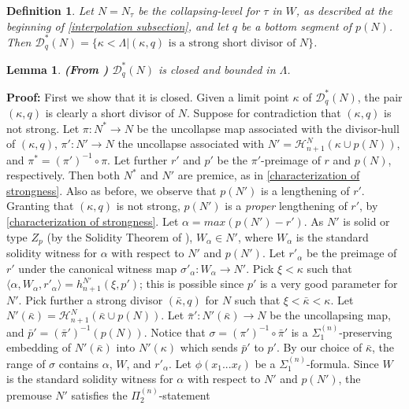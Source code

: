 \documentclass[12pt]{article}
\newtheorem{lem}[thm]{Lemma}
\newtheorem{defn}[thm]{Definition}
\begin{document}
\begin{defn} \label{set of strong divisors}
Let $N = N_\tau$ be the collapsing-level for $\tau$ in $W$, as described at the beginning of \ref{interpolation subsection}, and let $q$ be a bottom segment of $p(N)$.  Then $\mathcal{D}^*_q (N) = \{ \kappa < \Lambda | (\kappa , q) \text{ is a strong short divisor of } N \}$.
\end{defn}



\begin{lem} \label{strong short divisors closed and bounded}
\textbf{(From \cite{zeman square proof})}
$\mathcal{D}^*_q (N)$ is closed and bounded in $\Lambda$.
\end{lem}

\textbf{Proof:} First we show that it is closed.  Given a limit point $\kappa$ of $\mathcal{D}^*_q (N)$, the pair $( \kappa , q)$ is clearly a short divisor of $N$.  Suppose for contradiction that $(\kappa , q)$ is not strong.  Let $\pi : N^* \longrightarrow N$ be the uncollapse map associated with the divisor-hull of $(\kappa, q)$, $\pi' : N' \longrightarrow N$ the uncollapse associated with $N' =  \mathcal{H}_{n+1}^N ( \kappa \cup p(N) )$, and $\pi^* = ( \pi')^{-1} \circ \pi$.  Let further $r'$ and $p'$ be the $\pi'$-preimage of $r$ and $p(N)$, respectively.  Then both $N^*$ and $N'$ are premice, as in \ref{characterization of strongness}.  Also as before, we observe that $p(N')$ is a lengthening of $r'$.\\

Granting that $(\kappa , q)$ is not strong, $p (N')$ is a \textit{proper} lengthening of $r'$, by \ref{characterization of strongness}.  Let $\alpha = max ( p(N') - r' )$.  As $N'$ is solid or type $Z_p$ (by the Solidity Theorem of \cite{FSPIPM}), $W_\alpha \in N'$, where $W_\alpha$ is the standard solidity witness for $\alpha$ with respect to $N'$ and $p(N')$.  Let $r'_\alpha$ be the preimage of $r'$ under the canonical witness map $\sigma'_\alpha : W_\alpha \longrightarrow N'$.  Pick $\xi < \kappa$ such that $\langle \alpha , W_\alpha , r'_\alpha \rangle = h_{n+1}^{N'} ( \xi , p' )$; this is possible since $p'$ is a very good parameter for $N'$.  Pick further a strong divisor $( \bar{\kappa} , q )$ for $N$ such that $\xi < \bar{\kappa } < \kappa$.  Let $N'(\bar{\kappa}) = \mathcal{H}_{n+1}^N ( \bar{\kappa} \cup p(N) )$.  Let $\bar{\pi}' : N'(\bar{\kappa}) \longrightarrow N$ be the uncollapsing map, and $\bar{p}' = (\bar{\pi}')^{-1} (p(N))$.  Notice that $\sigma = (\pi')^{-1} \circ \bar{\pi}'$ is a $\Sigma_1^{(n)}$-preserving embedding of $N' (\bar{\kappa })$ into $N' (\kappa )$ which sends $\bar{p}'$ to $p'$.  By our choice of $\bar{\kappa}$, the range of $\sigma$ contains $\alpha$, $W$, and $r'_\alpha$.  Let $\phi (x_1 ... x_\ell )$ be a $\Sigma_1^{(n)}$-formula.  Since $W$ is the standard solidity witness for $\alpha$ with respect to $N'$ and $p(N')$, the premouse $N'$ satisfies the $\Pi_2^{(n)}$-statement
\end{document}
